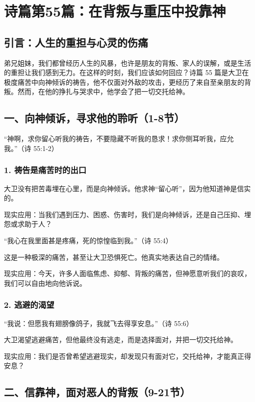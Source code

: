 \documentclass[a4paper, 12pt]{article}
\begin{document}
\section{诗篇第55篇：在背叛与重压中投靠神}
\subsection*{引言：人生的重担与心灵的伤痛}
弟兄姐妹，我们都曾经历人生的风暴，也许是朋友的背叛、家人的误解，或是生活的重担让我们感到无力。在这样的时刻，我们应该如何回应？诗篇 55 篇是大卫在极度痛苦中向神倾诉的祷告，他不仅面对外敌的攻击，更经历了来自至亲朋友的背叛。然而，在他的挣扎与哭求中，他学会了把一切交托给神。

\subsection*{一、向神倾诉，寻求他的聆听（1-8节）}
“神啊，求你留心听我的祷告，不要隐藏不听我的恳求！求你侧耳听我，应允我。”（诗 55:1-2）

\subsubsection*{1. 祷告是痛苦时的出口}
\hspace{0.6cm}大卫没有把苦毒埋在心里，而是向神倾诉。他求神“留心听”，因为他知道神是信实的。

现实应用：当我们遇到压力、困惑、伤害时，我们是向神倾诉，还是自己压抑、埋怨或求助于人？

\vspace{0.2cm}

“我心在我里面甚是疼痛，死的惊惶临到我。”（诗 55:4）

这是一种极深的痛苦，甚至让大卫恐惧死亡。他真实地表达自己的情绪。

现实应用：今天，许多人面临焦虑、抑郁、背叛的痛苦，但神愿意听我们的哀叹，我们可以自由地向他诉说。
\subsubsection*{2. 逃避的渴望}
“我说：但愿我有翅膀像鸽子，我就飞去得享安息。”（诗 55:6）

大卫渴望逃避痛苦，但他最终没有逃走，而是选择面对，并把一切交托给神。

现实应用：我们是否曾希望逃避现实，却发现只有面对它，交托给神，才能真正得安息？
\subsection*{二、信靠神，面对恶人的背叛（9-21节）}
\end{document}
